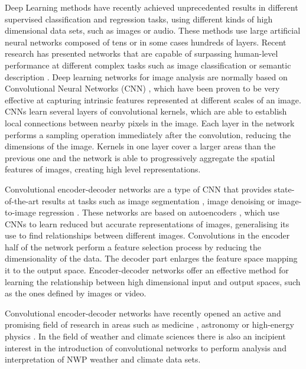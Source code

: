 \medskip

Deep Learning \citep{lecun2015deep} methods have recently achieved unprecedented results in different supervised classification and regression tasks, using different kinds of high dimensional data sets, such as images or audio. These methods use large artificial neural networks composed of tens or in some cases hundreds of layers. Recent research has presented networks that are capable of surpassing human-level performance at different complex tasks such as image classification \citep{krizhevsky2012imagenet} or semantic description \citep{karpathy2015deep}. Deep learning networks for image analysis are normally based on Convolutional Neural Networks (CNN) \citep{krizhevsky2012imagenet}, which have been proven to be very effective at capturing intrinsic features represented at different scales of an image. CNNs learn several layers of convolutional kernels, which are able to establish local connections between nearby pixels in the image. Each layer in the network performs a sampling operation immediately after the convolution, reducing the dimensions of the image. Kernels in one layer cover a larger areas than the previous one and the network is able to progressively aggregate the spatial features of images, creating high level representations.

\medskip

Convolutional encoder-decoder networks are a type of CNN that provides state-of-the-art results at tasks such as image segmentation \citep{badrinarayanan2017segnet}, image denoising \citep{mao2016image} or image-to-image regression \citep{isola2017image}. These networks are based on autoencoders \citep{hinton2006reducing}, which use CNNs to learn reduced but accurate representations of images, generalising its use to find relationships between different images. Convolutions in the encoder half of the network perform a feature selection process by reducing the dimensionality of the data. The decoder part enlarges the feature space mapping it to the output space. Encoder-decoder networks offer an effective method for learning the relationship between high dimensional input and output spaces, such as the ones defined by images or video.

\medskip

Convolutional encoder-decoder networks have recently opened an active and promising field of research in areas such as medicine \citep{greenspan2016guest}, astronomy \citep{shallue2018identifying} or high-energy physics \citep{baldi2014searching}. In the field of weather and climate sciences there is also an incipient interest in the introduction of convolutional networks to perform analysis and interpretation of NWP weather and climate data sets.

